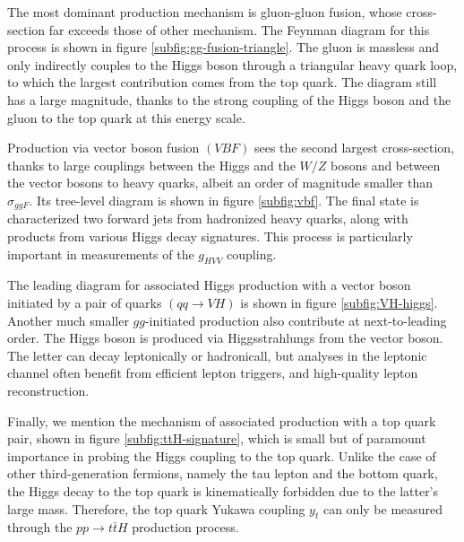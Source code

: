 The most dominant production mechanism is gluon-gluon fusion, whose cross-section far exceeds those of other mechanism. The Feynman diagram for this process is shown in figure \ref{subfig:gg-fusion-triangle}. The gluon is massless and only indirectly couples to the Higgs boson through a triangular heavy quark loop, to which the largest contribution comes from the top quark. The diagram still has a large magnitude, thanks to the strong coupling of the Higgs boson and the gluon to the top quark at this energy scale. 

Production via vector boson fusion $(VBF)$ sees the second largest cross-section, thanks to large couplings between the Higgs and the $W/Z$ bosons and between the vector bosons to heavy quarks, albeit an order of magnitude smaller than $\sigma_{ggF}$. Its tree-level diagram is shown in figure \ref{subfig:vbf}. The final state is characterized two forward jets from hadronized heavy quarks, along with products from various Higgs decay signatures. This process is particularly important in measurements of the $g_{HVV}$ coupling.

The leading diagram for associated Higgs production with a vector boson initiated by a pair of quarks $(qq\rightarrow VH)$ is shown in figure \ref{subfig:VH-higgs}. Another much smaller $gg$-initiated production also contribute at next-to-leading order. The Higgs boson is produced via Higgsstrahlungs from the vector boson. The letter can decay leptonically or hadronicall, but analyses in the leptonic channel often benefit from efficient lepton triggers, and high-quality lepton reconstruction. 

Finally, we mention the mechanism of associated production with a top quark pair, shown in figure \ref{subfig:ttH-signature}, which is small but of paramount importance in probing the Higgs coupling to the top quark. Unlike the case of other third-generation fermions, namely the tau lepton and the bottom quark, the Higgs decay to the top quark is kinematically forbidden due to the latter's large mass. Therefore, the top quark Yukawa coupling $y_t$ can only be measured through the $pp\rightarrow t\bar{t}H$ production process. 

